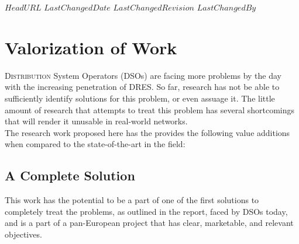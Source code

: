
\svnidlong
{$HeadURL$}
{$LastChangedDate$}
{$LastChangedRevision$}
{$LastChangedBy$}

\chapter{Valorization of Work}

\lettrine{D}{istribution} System Operators (DSOs) are facing more problems by the day with the increasing penetration of DRES. So far, research has not be able to sufficiently identify solutions for this problem, or even assuage it. The little amount of research that attempts to treat this problem has several shortcomings that will render it unusable in real-world networks.\\

The research work proposed here has the provides the following value additions when compared to the state-of-the-art in the field:





\section*{A Complete Solution}
This work has the potential to be a part of one of the first solutions to completely treat the problems, as outlined in the report, faced by DSOs today, and is a part of a pan-European project that has clear, marketable, and relevant objectives.\\


